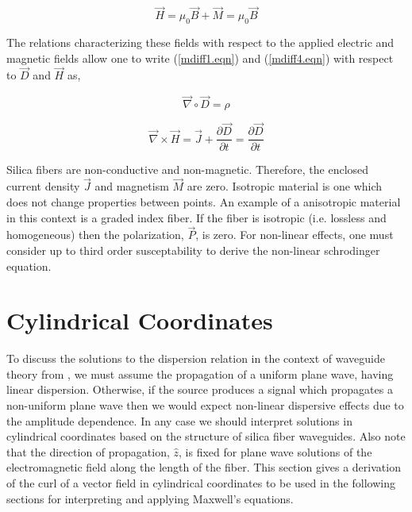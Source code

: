 \documentclass[12pt]{article}
\theoremstyle{definition}
\numberwithin{equation}{section}
\begin{document}
\begin{equation}
\vec{H}=\mu_{0}\vec{B} + \vec{M}=\mu_{0}\vec{B}
\label{magintensity.eqn}
\end{equation}

The relations characterizing these fields with respect to the applied electric and magnetic fields allow one to write (\ref{mdiff1.eqn}) and (\ref{mdiff4.eqn}) with respect to $\vec{D}$ and $\vec{H}$ as,

\begin{equation}
\vec{\nabla}\circ\vec{D}=\rho
\label{mdiff5.eqn}
\end{equation}

\begin{equation}
\vec{\nabla}\times\vec{H}=\vec{J}+\frac{\partial{\vec{D}}}{\partial{t}}=\frac{\partial{\vec{D}}}{\partial{t}}
\label{mdiff6.eqn}
\end{equation}


Silica fibers are non-conductive and non-magnetic. Therefore, the enclosed current density $\vec{J}$ and magnetism $\vec{M}$ are zero. Isotropic material is one which does not change properties between points. An example of a anisotropic material in this context is a graded index fiber. If the fiber is isotropic (i.e. lossless and homogeneous) then the polarization, $\vec{P}$, is zero. For non-linear effects, one must consider up to third order susceptability to derive the non-linear schrodinger equation.

\section{Cylindrical Coordinates}

To discuss the solutions to the dispersion relation in the context of waveguide theory from \cite{Okamoto}, we must assume the propagation of a uniform plane wave, having linear dispersion. Otherwise, if the source produces a signal which propagates a non-uniform plane wave then we would expect non-linear dispersive effects due to the amplitude dependence. In any case we should interpret solutions in cylindrical coordinates based on the structure of silica fiber waveguides. Also note that the direction of propagation, $\hat{z}$, is fixed for plane wave solutions of the electromagnetic field along the length of the fiber. This section gives a derivation of the curl of a vector field in cylindrical coordinates to be used in the following sections for interpreting and applying Maxwell's equations.\\
\end{document}
